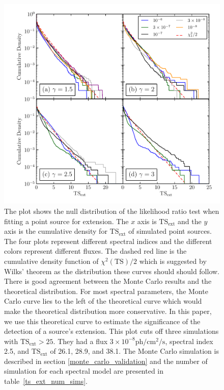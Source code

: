 \documentclass[12pt,preprint]{aastex}
\newcommand{\ph}{\text{ph}\xspace}
\newcommand{\cm}{\text{cm}\xspace}
\renewcommand{\sec}{\text{s}\xspace}
\newcommand{\tsext}{{\ensuremath{\text{TS}_{\text{ext}}}}\xspace}
\newcommand{\ts}{\text{TS}\xspace}
\begin{document}
\clearpage
\begin{figure}
  \begin{center}
    \includegraphics{mc_plots/ts_ext_emin_1000.pdf}
    \end{center}
    \caption{
     The plot shows the null distribution of
    the likelihood ratio test when fitting a point source for extension.
    The $x$ axis is \tsext and the $y$ axis is the cumulative density
    for \tsext of simulated point sources. The four plots represent
    different spectral indices and the different colors represent
    different fluxes.  The dashed red line is the cumulative density
    function of $\chi^2(\ts)/2$ which is suggested by Wilks' theorem
    as the distribution these curves should should follow.  There is
    good agreement between the Monte Carlo results and
    the theoretical distribution. For most spectral parameters, the
    Monte Carlo curve lies to the left of the theoretical curve which
    would make the theoretical distribution more conservative.  In this
    paper, we use this theoretical curve to estimate the significance of
    the detection of a source's extension. This plot cuts off 
    three simulations with $\tsext>25$. They 
    had a flux $3\times10^{-8}\ph/\cm^2/\sec$, spectral index
    2.5, and \tsext of 26.1, 28.9, and 38.1.
    The Monte Carlo simulation is described in 
    section \ref{monte_carlo_validation} and 
    the number of simulation for each spectral model 
    are presented in table~\ref{ts_ext_num_sims}.
    }\label{ts_ext_mc}
  \end{figure}
\end{document}
